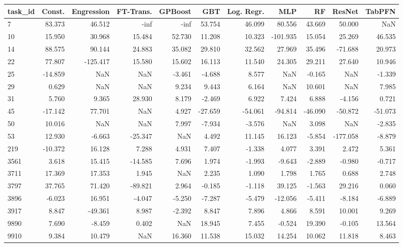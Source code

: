 \begin{tabular}{lrrrrrrrrrr}
\toprule
task\_id & Const. & Engression & FT-Trans. & GPBoost & GBT & Log. Regr. & MLP & RF & ResNet & TabPFN \\
\midrule
7 & 83.373 & 46.512 & -inf & -inf & 53.754 & 46.099 & 80.556 & 43.669 & 50.000 & NaN \\
10 & 15.950 & 30.968 & 15.484 & 52.730 & 11.208 & 10.323 & -101.935 & 15.054 & 25.269 & 46.535 \\
14 & 88.575 & 90.144 & 24.883 & 35.082 & 29.810 & 32.562 & 27.969 & 35.496 & -71.688 & 20.973 \\
22 & 77.807 & -125.417 & 15.580 & 15.602 & 16.113 & 11.540 & 24.305 & 29.211 & 27.640 & 10.946 \\
25 & -14.859 & NaN & NaN & -3.461 & -4.688 & 8.577 & NaN & -0.165 & NaN & -1.339 \\
29 & 0.629 & NaN & NaN & 9.234 & 9.443 & 6.164 & NaN & 10.601 & NaN & 7.985 \\
31 & 5.760 & 9.365 & 28.930 & 8.179 & -2.469 & 6.922 & 7.424 & 6.888 & -4.156 & 0.721 \\
45 & -17.142 & 77.701 & NaN & 4.927 & -27.659 & -54.061 & -94.814 & -46.090 & -50.872 & -51.073 \\
50 & 10.016 & NaN & NaN & 7.997 & -7.934 & -3.576 & NaN & 3.098 & NaN & -2.835 \\
53 & 12.930 & -6.663 & -25.347 & NaN & 4.492 & 11.145 & 16.123 & -5.854 & -177.058 & -8.879 \\
219 & -10.372 & 16.128 & 7.288 & 4.931 & 7.407 & -1.338 & 4.077 & 3.391 & 2.472 & 5.361 \\
3561 & 3.618 & 15.415 & -14.585 & 7.696 & 1.974 & -1.993 & -9.643 & -2.889 & -0.980 & -0.717 \\
3711 & 17.369 & 17.353 & 1.945 & NaN & 2.235 & 1.090 & 1.798 & 1.765 & 0.688 & 2.748 \\
3797 & 37.765 & 71.420 & -89.821 & 2.964 & -0.185 & -1.118 & 39.125 & -1.563 & 29.216 & 0.060 \\
3896 & -6.023 & 16.951 & -4.047 & -5.250 & -7.287 & -5.479 & -12.056 & -5.411 & -8.184 & -6.889 \\
3917 & 8.847 & -49.361 & 8.987 & -2.392 & 8.847 & 7.896 & 4.866 & 8.591 & 10.001 & 9.269 \\
9890 & 7.690 & -8.459 & 0.402 & NaN & 18.945 & 7.455 & -0.524 & 19.390 & -0.105 & 13.564 \\
9910 & 9.384 & 10.479 & NaN & 16.360 & 11.538 & 15.032 & 14.254 & 10.062 & 11.818 & 8.463 \\

\end{tabular}
